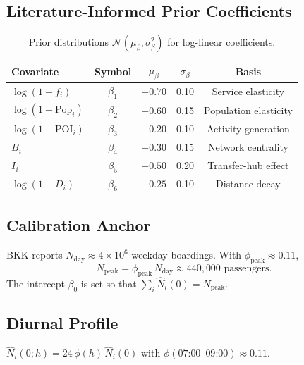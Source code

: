 \documentclass[12pt,a4paper]{article}
\theoremstyle{plain}
\theoremstyle{definition}
\theoremstyle{remark}
\begin{document}
\subsection{Literature-Informed Prior Coefficients}

\begin{table}[htbp]
\centering
\small
\begin{tabular}{lcccc}
\toprule
Covariate & Symbol & $\mu_\beta$ & $\sigma_\beta$ & Basis \\
\midrule
$\log(1+f_i)$                & $\beta_1$ & $+0.70$ & 0.10 & Service elasticity \citep{schiewe2022} \\
$\log(1+\mathrm{Pop}_i)$    & $\beta_2$ & $+0.60$ & 0.15 & Population elasticity \\
$\log(1+\mathrm{POI}_i)$    & $\beta_3$ & $+0.20$ & 0.10 & Activity generation \\
$B_i$                        & $\beta_4$ & $+0.30$ & 0.15 & Network centrality \\
$I_i$                        & $\beta_5$ & $+0.50$ & 0.20 & Transfer-hub effect \\
$\log(1+D_i)$                & $\beta_6$ & $-0.25$ & 0.10 & Distance decay \\
\bottomrule
\end{tabular}
\caption{Prior distributions $\mathcal{N}(\mu_\beta,\sigma_\beta^2)$ for
  log-linear coefficients.}
\label{tab:priors}
\end{table}

\subsection{Calibration Anchor}

BKK reports $N_{\mathrm{day}}\approx4\times10^6$ weekday boardings.
With $\phi_{\mathrm{peak}}\approx0.11$,
\begin{equation}
  N_{\mathrm{peak}}=\phi_{\mathrm{peak}}\,N_{\mathrm{day}}\approx440{,}000\text{ passengers.}
\end{equation}
The intercept $\beta_0$ is set so that $\sum_i\hat{N}_i(0)=N_{\mathrm{peak}}$.

\subsection{Diurnal Profile}

$\hat{N}_i(0;h)=24\,\phi(h)\,\hat{N}_i(0)$ with
$\phi(07\text{:}00\text{--}09\text{:}00)\approx0.11$.
\end{document}
